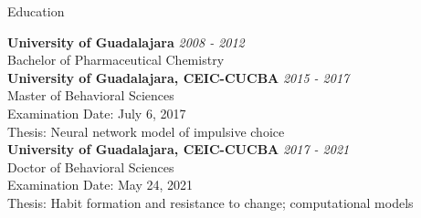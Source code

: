 \documentclass{resume} %
\begin{document}
\begin{rSection}{Education}

{\bf University of Guadalajara} \hfill {\em 2008 - 2012} \\
Bachelor of Pharmaceutical Chemistry \\
{\bf University of Guadalajara, CEIC-CUCBA} \hfill {\em 2015 - 2017} \\
Master of Behavioral Sciences \\
Examination Date: July 6, 2017\\
Thesis: Neural network model of impulsive choice \\
{\bf University of Guadalajara, CEIC-CUCBA} \hfill {\em 2017 - 2021} \\
Doctor of Behavioral Sciences \\
Examination Date: May 24, 2021\\
Thesis: Habit formation and resistance to change; computational models

\end{rSection}
\end{document}
